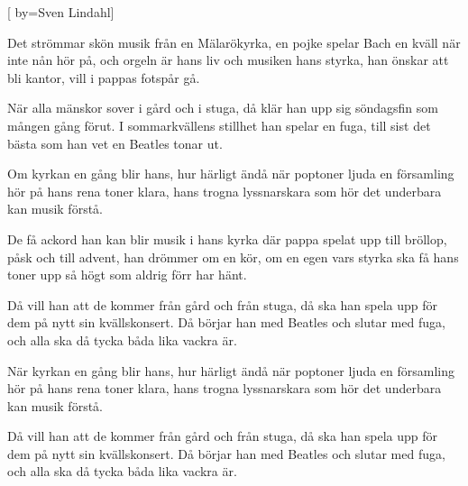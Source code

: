 


[ 	%
	by={Sven Lindahl}]		%

\beginverse*		%
Det strömmar skön musik från en Mälarökyrka,
en pojke spelar Bach en kväll när inte nån hör på,
och orgeln är hans liv och musiken hans styrka,
han önskar att bli kantor, vill i pappas fotspår gå.
\endverse			%

\beginverse*		%
När alla mänskor sover i gård och i stuga,
då klär han upp sig söndagsfin som mången gång förut.
I sommarkvällens stillhet han spelar en fuga,
till sist det bästa som han vet en Beatles tonar ut.
\endverse			%

\beginverse*		%
Om kyrkan en gång blir hans, hur härligt ändå 
när poptoner ljuda en församling hör på
hans rena toner klara,
hans trogna lyssnarskara 
som hör det underbara 
kan musik förstå.
\endverse			%

\beginverse*		%
De få ackord han kan blir musik i hans kyrka
där pappa spelat upp till bröllop, påsk och till advent,
han drömmer om en kör, om en egen vars styrka
ska få hans toner upp så högt som aldrig förr har hänt.
\endverse			%

\beginverse*		%
Då vill han att de kommer från gård och från stuga,
då ska han spela upp för dem på nytt sin kvällskonsert.
Då börjar han med Beatles och slutar med fuga,
och alla ska då tycka båda lika vackra är.
\endverse			%

\beginverse*		%
När kyrkan en gång blir hans, hur härligt ändå 
när poptoner ljuda en församling hör på
hans rena toner klara,
hans trogna lyssnarskara 
som hör det underbara 
kan musik förstå.
\endverse			%

\beginverse*		%
Då vill han att de kommer från gård och från stuga,
då ska han spela upp för dem på nytt sin kvällskonsert.
Då börjar han med Beatles och slutar med fuga,
och alla ska då tycka båda lika vackra är.
\endverse			%
\endsong			%
